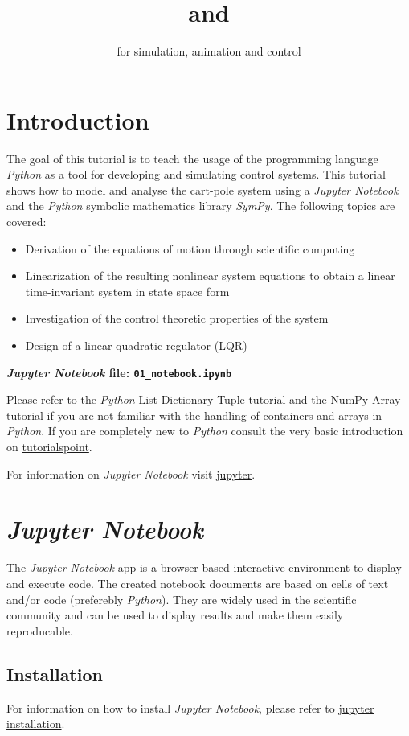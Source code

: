 \documentclass[a4paper,11pt,headings=standardclasses,parskip=half]{scrartcl}
\title{\jp and \sympy}
\subtitle{\py for simulation, animation and control}%
\author{}
\date{}
\newcommand{\py}{\emph{Python}\xspace}
\newcommand{\jp}{\emph{Jupyter Notebook}\xspace}
\newcommand{\sympy}{\emph{SymPy}\xspace}
\begin{document}
\maketitle%

\tableofcontents

\newpage

\section{Introduction}
The goal of this tutorial is to teach the usage of the programming language \py as a tool for developing and simulating control systems. This tutorial shows how to model and analyse the cart-pole system using a \jp and the \py symbolic mathematics library \sympy.  The following topics are covered:
\begin{itemize}
\item Derivation of the equations of motion through scientific computing
\item Linearization of the resulting nonlinear system equations to obtain a linear time-invariant system in state space form
\item Investigation of the control theoretic properties of the system
\item Design of a linear-quadratic regulator (LQR)
\end{itemize}
\textbf{\emph{Jupyter Notebook} file: \texttt{01\_notebook.ipynb}}

Please refer to the \href{http://cs231n.github.io/python-numpy-tutorial/#python-containers}{\py List-Dictionary-Tuple tutorial} and the \href{http://cs231n.github.io/python-numpy-tutorial/#numpy}{NumPy Array tutorial} if you are not familiar with the handling of containers and arrays in \py. If you are completely new to \py consult the very basic introduction on \href{https://www.tutorialspoint.com/python/index.htm}{tutorialspoint}.

For information on \jp visit \href{https://jupyter.org}{jupyter}. 
\section{\jp}
The \jp app is a browser based interactive environment to display and execute code. The created notebook documents are based on cells of text and/or code (preferebly \py). They are widely used in the scientific community and can be used to display results and make them easily reproducable.
\subsection{Installation}
For information on how to install \jp, please refer to \href{https://jupyter.readthedocs.io/en/latest/install.html}{jupyter installation}. 
\end{document}
